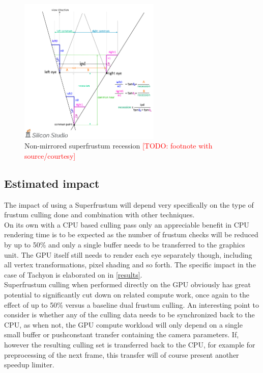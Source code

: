 \begin{figure}[htb]
  \centering
  \includegraphics[width=0.6\textwidth]{pictures/Oddou_Asymmetry}
  \caption{Non-mirrored superfrustum recession\cite{Oddou.23.05.2017} \textcolor{red}{[TODO: footnote with source/courtesy]}} \label{fig:Oddou_Asymmetry}
\end{figure}

\subsection{Estimated impact}
The impact of using a Superfrustum will depend very specifically on the type of frustum culling done and combination with other techniques. \\
On its own with a CPU based culling pass only an appreciable benefit in CPU rendering time is to be expected as the number of frustum checks will be reduced by up to 50\% and only a single buffer needs to be transferred to the graphics unit. The GPU itself still needs to render each eye separately though, including all vertex transformations, pixel shading and so forth. The specific impact in the case of Tachyon is elaborated on in \autoref{results}. \\
Superfrustum culling when performed directly on the GPU obviously has great potential to significantly cut down on related compute work, once again to the effect of up to 50\% versus a baseline dual frustum culling. An interesting point to consider is whether any of the culling data needs to be synchronized back to the CPU, as when not, the GPU compute workload will only depend on a single small buffer or pushconstant transfer containing the camera parameters. If, however the resulting culling set is transferred back to the CPU, for example for preprocessing of the next frame, this transfer will of course present another speedup limiter. 

